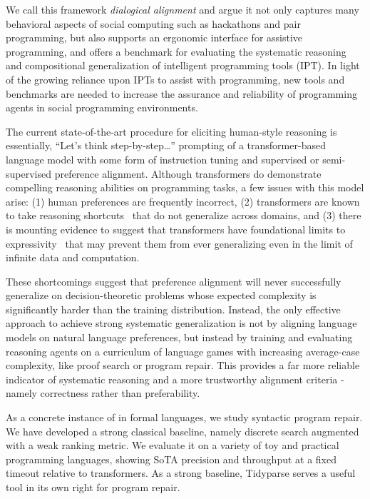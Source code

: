\documentclass[sigplan,screen]{acmart}
\begin{document}
We call this framework \emph{dialogical alignment} and argue it not only captures many behavioral aspects of social computing such as hackathons and pair programming, but also supports an ergonomic interface for assistive programming, and offers a benchmark for evaluating the systematic reasoning and compositional generalization of intelligent programming tools (IPT). In light of the growing reliance upon IPTs to assist with programming, new tools and benchmarks are needed to increase the assurance and reliability of programming agents in social programming environments.

The current state-of-the-art procedure for eliciting human-style reasoning is essentially, ``Let's think step-by-step\ldots'' prompting of a transformer-based language model with some form of instruction tuning and supervised or semi-supervised preference alignment. Although transformers do demonstrate compelling reasoning abilities on programming tasks, a few issues with this model arise: (1) human preferences are frequently incorrect, (2) transformers are known to take reasoning shortcuts~\cite{dziri2023faith, liu2022transformers} that do not generalize across domains, and (3) there is mounting evidence to suggest that transformers have foundational limits to expressivity~\cite{merrill2022saturated, chiang2023tighter} that may prevent them from ever generalizing even in the limit of infinite data and computation.

These shortcomings suggest that preference alignment will never successfully generalize on decision-theoretic problems whose expected complexity is significantly harder than the training distribution. Instead, the only effective approach to achieve strong systematic generalization is not by aligning language models on natural language preferences, but instead by training and evaluating reasoning agents on a curriculum of language games with increasing average-case complexity, like proof search or program repair. This provides a far more reliable indicator of systematic reasoning and a more trustworthy alignment criteria - namely correctness rather than preferability.

As a concrete instance of in formal languages, we study syntactic program repair. We have developed a strong classical baseline, namely discrete search augmented with a weak ranking metric. We evaluate it on a variety of toy and practical programming languages, showing SoTA precision and throughput at a fixed timeout relative to transformers. As a strong baseline, Tidyparse serves a useful tool in its own right for program repair.
\end{document}
